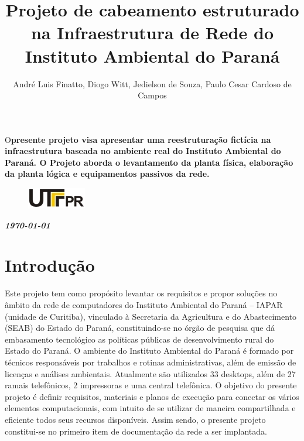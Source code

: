 \documentclass[	DIV=calc,%
							paper=a4,%
							fontsize=12pt,%
							onecolumn]{scrartcl}	 					%
\title{Projeto de cabeamento estruturado na Infraestrutura de Rede do Instituto Ambiental do Paraná}					%
\author{André Luis Finatto, Diogo Witt, Jedielson de Souza, Paulo Cesar Cardoso de Campos}  	%
\date{}																				%
\newcommand{\initial}[1]{%
     \lettrine[lines=3,lhang=0.3,nindent=0em]{
     				\color{DarkGoldenrod}
     				{\textsf{#1}}}{}}
\begin{document}
\maketitle
\thispagestyle{fancy} 	
\thispagestyle{empty}		%





\initial{O}\textbf{presente projeto visa apresentar uma reestruturação fictícia na infraestrutura baseada no ambiente real do Instituto Ambiental do Paraná. O Projeto aborda o levantamento da planta física, elaboração da planta lógica e equipamentos passivos da rede.}


\begin{figure}
	\centering
	\includegraphics{utfpr}
\end{figure}

\vspace{2cm}
\centerline{\textit{\textbf{\today}}}

\clearpage
    \renewcommand*\listfigurename{Lista de figuras}
\listoffigures

\renewcommand*\listtablename{Lista de tabelas}
\listoftables




\clearpage
\renewcommand{\contentsname}{Sumário}
\tableofcontents
\clearpage

\section{Introdução}
\onehalfspacing %
Este projeto tem como propósito levantar os requisitos e propor soluções no âmbito da rede de computadores do Instituto Ambiental do Paraná – IAPAR (unidade de Curitiba),  vinculado à Secretaria da Agricultura e do Abastecimento (SEAB) do Estado do Paraná, constituindo-se no órgão de pesquisa que dá embasamento tecnológico as políticas públicas de desenvolvimento rural do Estado do Paraná.
O ambiente do Instituto Ambiental do Paraná é formado por técnicos responsáveis por trabalhos e rotinas administrativas, além de emissão de licenças e análises ambientais.
Atualmente são utilizados 33 desktops, além de 27 ramais telefônicos, 2 impressoras e uma central telefônica.
O objetivo do presente projeto é definir requisitos, materiais e planos de execução para conectar os vários elementos computacionais, com intuito de se utilizar de maneira compartilhada e eficiente todos seus recursos disponíveis. 
Assim sendo, o presente projeto constitui-se no primeiro item de documentação da rede a ser implantada.
\end{document}
